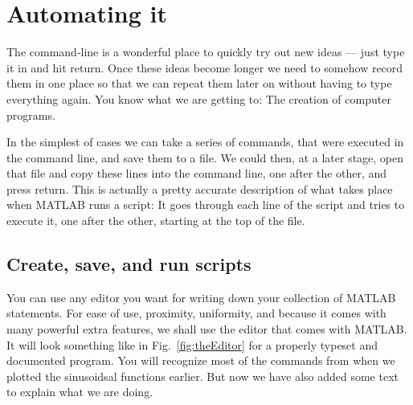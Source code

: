 \section{Automating it}
The command-line is a wonderful place to quickly try out new ideas --- just type it in and hit return.
Once these ideas become longer we need to somehow record them in one place so that we can repeat them later on without having to type everything again.
You know what we are getting to: The creation of computer programs.

In the simplest of cases we can take a series of commands, that were executed in the command line, and save them to a file. We could then, at a later stage, open that file and copy these lines into the command line, one after the other, and press return.  This is actually a pretty accurate description of what takes place when MATLAB runs a script: It goes through each line of the script and tries to execute it, one after the other, starting at the top of the file.

\subsection{Create, save, and run scripts}
You can use any editor you want for writing down your collection of MATLAB statements.
For ease of use, proximity, uniformity, and because it comes with many powerful extra features, we shall use the editor that comes with MATLAB\@.
It will look something like in Fig.~\ref{fig:theEditor} for a properly typeset and documented program. 
You will recognize most of the commands from when we plotted the sinusoidsal functions earlier.
But now we have also added some text to explain what we are doing.